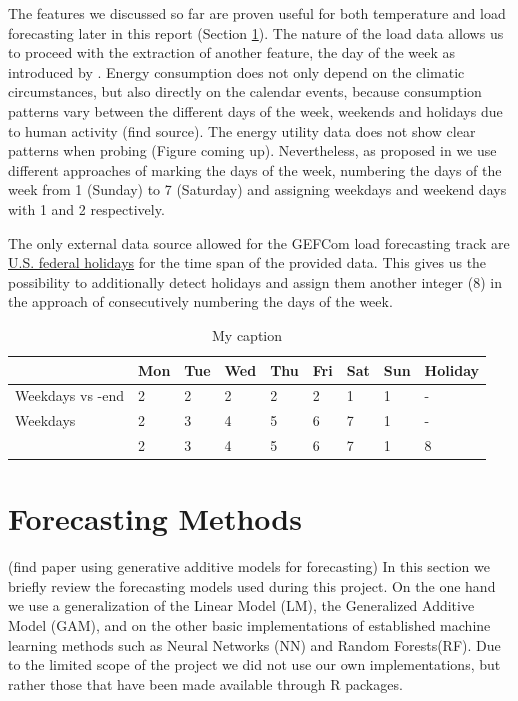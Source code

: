 \documentclass[conference]{IEEEtran}
\begin{document}
The features we discussed so far are proven useful for both temperature and load forecasting later in this report (Section \ref{}). The nature of the load data allows us to proceed with the extraction of another feature, the day of the week as introduced by \cite{Hong2010}. Energy consumption does not only depend on the climatic circumstances, but also directly on the calendar events, because consumption patterns vary between the different days of the week, weekends and holidays due to human activity (find source). The energy utility data does not show clear patterns when probing (Figure coming up). Nevertheless, as proposed in \cite{Hyndman2010} we use different approaches of marking the days of the week, numbering the days of the week from 1 (Sunday) to 7 (Saturday) and assigning weekdays and weekend days with 1 and 2 respectively.\par
The only external data source allowed for the GEFCom load forecasting track are \href{http://archive.opm.gov/Operating\_Status\_Schedules/fedhol/2014.asp}{U.S. federal holidays} for the time span of the provided data. This gives us the possibility to additionally detect holidays and assign them another integer (8) in the approach of consecutively numbering the days of the week.\par

\begin{table}[h]
\centering
\begin{tabular}{@{}lllllllll@{}}
\toprule
 & Mon & Tue & Wed & Thu & Fri & Sat & Sun & Holiday \\ \midrule
Weekdays vs -end & 2 & 2 & 2 & 2 & 2 & 1 & 1 & - \\
Weekdays & 2 & 3 & 4 & 5 & 6 & 7 & 1 & - \\
 & 2 & 3 & 4 & 5 & 6 & 7 & 1 & 8 \\ \bottomrule
\end{tabular}
\caption{My caption}
\label{my-label}
\end{table}

\section{Forecasting Methods}
(find paper using generative additive models for forecasting)
In this section we briefly review the forecasting models used during this project. On the one hand we use a generalization of the Linear Model (LM), the Generalized Additive Model (GAM), and on the other basic implementations of established machine learning methods such as Neural Networks (NN) and Random Forests(RF). Due to the limited scope of the project we did not use our own implementations, but rather those that have been made available through R packages.
\end{document}
